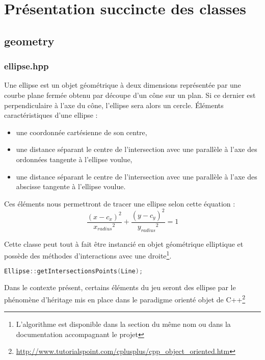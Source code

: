 \documentclass[a4paper,11pt]{report}
\begin{document}
\chapter[Les classes]{Présentation succincte des classes}
\section[Les objets géométriques]{geometry}

\subsection[Ellipse]{ellipse.hpp}
\begin{center}
\end{center}
Une ellipse est un objet géométrique à deux dimensions représentée par
une courbe plane fermée obtenu par découpe d'un cône sur un plan. Si ce dernier
est perpendiculaire à l'axe du cône, l'ellipse sera alors un cercle.
Éléments caractéristiques d'une ellipse :
\begin{itemize}
	\item une coordonnée cartésienne de son centre,
	\item une distance séparant le centre de l'intersection avec une parallèle à
		l'axe des ordonnées tangente à l'ellipse voulue,
	\item une distance séparant le centre de l'intersection avec une parallèle à
		l'axe des abscisse tangente à l'ellipse voulue.
\end{itemize}
Ces éléments nous permettront de tracer une ellipse selon cette équation :
$$\frac{(x - c_x)^2}{{x_{radius}}^2} + \frac{(y - c_y)^2}{{y_{radius}}^2} = 1$$

Cette classe peut tout à fait être instancié en objet géométrique elliptique
et possède des méthodes d'interactions avec une droite\footnote{L'algorithme
	est disponible dans la section du même nom ou dans la documentation
accompagnant le projet}.
\begin{lstlisting}[frame=single,language=C++]
Ellipse::getIntersectionsPoints(Line);
\end{lstlisting}
Dans le contexte présent, certains éléments du jeu seront des ellipse par le 
phénomène d'héritage mis en place dans le paradigme orienté objet de
C++\footnote{\url{http://www.tutorialspoint.com/cplusplus/cpp_object_oriented.htm}}
\end{document}
